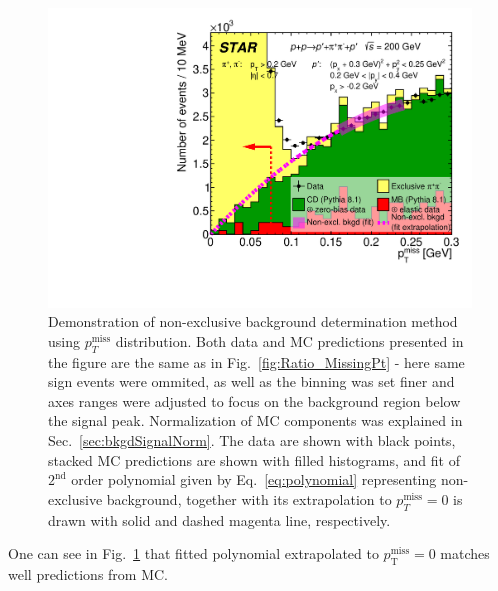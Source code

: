 \begin{figure}[ht!]
\centering%
\parbox{0.4725\textwidth}{%
  \centering%
  \includegraphics[width=\linewidth]{graphics/backgrounds/MissingPt_NonExclBkgdFitDemonstration.pdf} 
}%
\quad%
\parbox{0.4725\textwidth}{%
    \caption[Demonstration of non-exclusive background determination method using $p_{T}^{\text{miss}}$ distribution.]{Demonstration of non-exclusive background determination method using $p_{T}^{\text{miss}}$ distribution. Both data and MC predictions presented in the figure are the same as in Fig.~\ref{fig:Ratio_MissingPt} - here same sign events were ommited, as well as the binning was set finer and axes ranges were adjusted to focus on the background region below the signal peak. Normalization of MC components was explained in Sec.~\ref{sec:bkgdSignalNorm}. The data are shown with black points, stacked MC predictions are shown with filled histograms, and fit of $2^{\text{nd}}$ order polynomial given by Eq.~\eqref{eq:polynomial} representing non-exclusive background, together with its extrapolation to $p_{T}^{\text{miss}}=0$ is drawn with solid and dashed magenta line, respectively.}\label{fig:nonExclBkgdDetermination}%
}
\end{figure}


One can see in Fig.~\ref{fig:nonExclBkgdDetermination} that fitted polynomial extrapolated to $p_{\text{T}}^{\text{miss}}=0$ matches well predictions from MC. %

